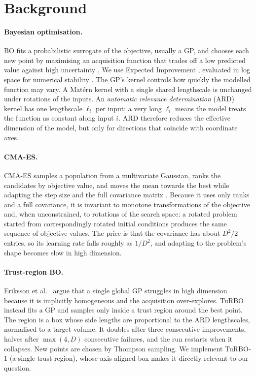 \documentclass[12pt]{article}
\begin{document}
\section{Background}
\paragraph{Bayesian optimisation.} BO fits a probabilistic surrogate of the objective, usually a GP,
and chooses each new point by maximising an acquisition function that trades off a low predicted
value against high uncertainty \cite{frazier2018tutorial}. We use Expected Improvement
\cite{jones1998ego}, evaluated in log space for numerical stability \cite{ament2023logei}. The GP's
kernel controls how quickly the modelled function may vary. A Mat\'ern kernel with a single shared
lengthscale is unchanged under rotations of the inputs. An \emph{automatic relevance determination}
(ARD) kernel has one lengthscale $\ell_i$ per input; a very long $\ell_i$ means the model treats the
function as constant along input $i$. ARD therefore reduces the effective dimension of the model,
but only for directions that coincide with coordinate axes.

\paragraph{CMA-ES.} CMA-ES samples a population from a multivariate Gaussian, ranks the candidates by
objective value, and moves the mean towards the best while adapting the step size and the full
covariance matrix \cite{hansen2016cma}. Because it uses only ranks and a full covariance, it is
invariant to monotone transformations of the objective and, when unconstrained, to rotations of the
search space: a rotated problem started from correspondingly rotated initial conditions produces
the same sequence of objective values. The price is that the covariance has about $D^2/2$ entries,
so its learning rate falls roughly as $1/D^2$, and adapting to the problem's shape becomes slow in
high dimension.

\paragraph{Trust-region BO.} Eriksson et al.~\cite{eriksson2019turbo} argue that a single global GP struggles in high
dimension because it is implicitly homogeneous and the acquisition over-explores. TuRBO instead fits
a GP and samples only inside a trust region around the best point. The region is a box whose side
lengths are proportional to the ARD lengthscales, normalised to a target volume. It doubles after
three consecutive improvements, halves after $\max(4,D)$ consecutive failures, and the run restarts
when it collapses. New points are chosen by Thompson sampling. We implement TuRBO-1 (a single trust
region), whose axis-aligned box makes it directly relevant to our question.
\end{document}
